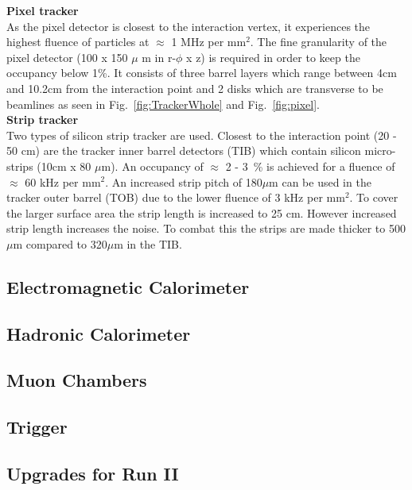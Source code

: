 \textbf{Pixel tracker}\\

As the pixel detector is closest to the interaction vertex, it experiences the highest fluence of particles at $\approx$ 1 MHz per mm$^{2}$. The fine granularity of the pixel detector (100 x 150 $\mu$ m in r-$\phi$ x z) is required in order to keep the occupancy below 1\%. It consists of three barrel layers which range between 4cm and 10.2cm from the interaction point and 2 disks which are transverse to be beamlines as seen in Fig.~\ref{fig:TrackerWhole} and Fig.~\ref{fig:pixel}.\\

\textbf{Strip tracker}\\
Two types of silicon strip tracker are used. Closest to the interaction point (20 - 50 cm) are the tracker inner barrel detectors (TIB) which contain silicon micro-strips (10cm x 80 $\mu$m). An occupancy of $\approx$ 2 - 3~\% is achieved for a fluence of $\approx$ 60 kHz per mm$^{2}$.
An increased strip pitch of 180$\mu$m can be used in the tracker outer barrel (TOB) due to the lower fluence of 3 kHz per mm$^{2}$. To cover the larger surface area the strip length is increased to 25 cm. However increased strip length increases the noise. To combat this the strips are made thicker to 500 $\mu$m compared to 320$\mu$m in the TIB.

\subsection{Electromagnetic Calorimeter}

\subsection{Hadronic Calorimeter}

\subsection{Muon Chambers}

\subsection{Trigger}



\subsection{Upgrades for Run II}



